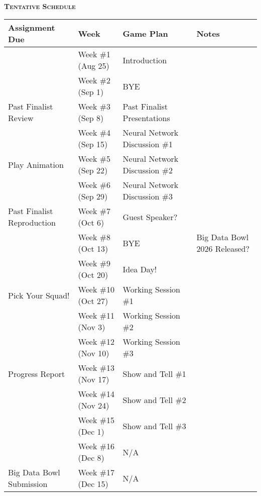 \documentclass[11pt]{article}
\begin{document}
~\\
\textbf{\textsc{Tentative Schedule}}
\begin{center}
  \begin{tabular}{llll}
    Assignment Due              & Week                & Game Plan                   & Notes\\
    \hline
                                & Week \#1 (Aug 25)   & Introduction\\
                                & Week \#2 (Sep 1)    & BYE\\
    Past Finalist Review        & Week \#3 (Sep 8)    & Past Finalist Presentations\\
                                & Week \#4 (Sep 15)   & Neural Network Discussion \#1\\
    Play Animation              & Week \#5 (Sep 22)   & Neural Network Discussion \#2\\
                                & Week \#6 (Sep 29)   & Neural Network Discussion \#3\\
    Past Finalist Reproduction  & Week \#7 (Oct 6)    & Guest Speaker?\\
                                & Week \#8 (Oct 13)   & BYE                         & Big Data Bowl 2026 Released?\\
                                & Week \#9 (Oct 20)   & Idea Day!\\
    Pick Your Squad!            & Week \#10 (Oct 27)  & Working Session \#1\\
                                & Week \#11 (Nov 3)   & Working Session \#2\\
                                & Week \#12 (Nov 10)  & Working Session \#3\\
    Progress Report             & Week \#13 (Nov 17)  & Show and Tell \#1\\
                                & Week \#14 (Nov 24)  & Show and Tell \#2\\
                                & Week \#15 (Dec 1)   & Show and Tell \#3\\
                                & Week \#16 (Dec 8)   & N/A\\
    Big Data Bowl Submission    & Week \#17 (Dec 15)  & N/A\\
  \end{tabular}
\end{center}
\end{document}
